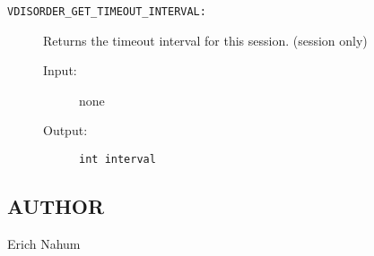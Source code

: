 \begin{description}
\item[{\tt VDISORDER\_GET\_TIMEOUT\_INTERVAL:}]
Returns the timeout interval for this session.  
(session only)
\begin{description}
\item[{\rm Input:}] none
\item[{\rm Output:}] {\tt int interval}
\end{description}


\end{description}



\subsection*{AUTHOR}

\noindent Erich Nahum
